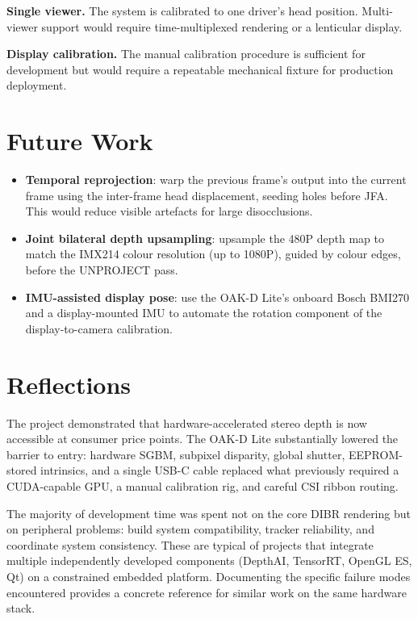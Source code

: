 \documentclass[11pt, a4paper]{report}
\begin{document}
\textbf{Single viewer.}
The system is calibrated to one driver's head position.
Multi-viewer support would require time-multiplexed rendering or a
lenticular display.

\textbf{Display calibration.}
The manual calibration procedure is sufficient for development but would
require a repeatable mechanical fixture for production deployment.

\section{Future Work}

\begin{itemize}[noitemsep]
    \item \textbf{Temporal reprojection}: warp the previous frame's
          output into the current frame using the inter-frame head
          displacement, seeding holes before JFA.
          This would reduce visible artefacts for large disocclusions.
    \item \textbf{Joint bilateral depth upsampling}: upsample the 480P
          depth map to match the IMX214 colour resolution (up to 1080P),
          guided by colour edges, before the UNPROJECT pass.
    \item \textbf{IMU-assisted display pose}: use the OAK-D Lite's
          onboard Bosch BMI270 and a display-mounted IMU to automate
          the rotation component of the display-to-camera calibration.
\end{itemize}

\section{Reflections}

The project demonstrated that hardware-accelerated stereo depth is now
accessible at consumer price points.
The OAK-D Lite substantially lowered the barrier to entry: hardware
SGBM, subpixel disparity, global shutter, EEPROM-stored intrinsics, and
a single USB-C cable replaced what previously required a CUDA-capable GPU,
a manual calibration rig, and careful CSI ribbon routing.

The majority of development time was spent not on the core DIBR rendering
but on peripheral problems: build system compatibility, tracker reliability,
and coordinate system consistency.
These are typical of projects that integrate multiple independently
developed components (DepthAI, TensorRT, OpenGL ES, Qt) on a constrained
embedded platform.
Documenting the specific failure modes encountered provides a concrete
reference for similar work on the same hardware stack.
\end{document}
